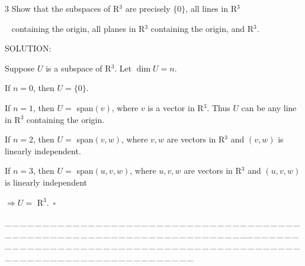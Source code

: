 \documentclass[a4paper, 11pt, UTF8]{article}
\begin{document}
\begin{large}
{\timesbf\Large 3} {\timessl\Large 
Show that the subspaces of {\timesbf R}$^3$ are precisely $\{0\}$, all lines in {\timesbf R}$^3$}\par\,\,\,
{\timessl\Large containing the origin, all planes in {\timesbf R}$^3$ containing the origin, and {\timesbf R}$^3$.
}\par
{\timesbf S\footnotesize{OLUTION:}}\par\quad
Suppose $U$ is a subspace of {\timesbf R}$^3$. Let $\dim U=n.$\par\quad
If $n=0$, then $U=\{0\}.$\par\quad
If $n=1$, then $U=$ span$(v)$, where $v$ is a vector in {\timesbf R}$^3$. Thus $U$ can be any line in {\timesbf R}$^3$ containing the origin.\par\quad
If $n=2$, then $U=$ span$(v,w)$, where $v,w$ are vectors in {\timesbf R}$^3$ and $(v,w)$ is linearly independent.\par {}\quad
If $n=3$, then $U=$ span$(u,v,w)$, where $u,v,w$ are vectors in {\timesbf R}$^3$ and $(u,v,w)$ is linearly independent\par
\centerline {$\Rightarrow U=$ {\timesbf R}$^3.\,\,\,\square$}\par
{\tiny \_\,\_\,\_\,\_\,\_\,\_\,\_\,\_\,\_\,\_\,\_\,\_\,\_\,\_\,\_\,\_\,\_\,\_\,\_\,\_\,\_\,\_\,\_\,\_\,\_\,\_\,\_\,\_\,\_\,\_\,\_\,\_\,\_\,\_\,\_\,\_\,\_\,\_\,\_\,\_\,\_\,\_\,\_\,\_\,\_\,\_\,\_\,\_\,\_\,\_\,\_\,\_\,\_\,\_\,\_\,\_\,\_\,\_\,\_\,\_\,\_\,\_\,\_\,\_\,\_\,\_\,\_\,\_\,\_\,\_\,\_\_\,\_\,\_\,\_\,\_\,\_\,\_\,\_\,\_\,\_\,\_\,\_\,\_\,\_\,\_\,\_\,\_\,\_\,\_\,\_\,\_\,\_\,\_\,\_\,\_\,\_\,\_\,\_\,\_\,\_\,\_\,\_\,\_\,\_\,\_\,\_\,\_\,\_\,\_\,\_\,\_\,\_\,\_\,\_\,\_\,\_\,\_\,\_\,\_\,\_\,\_\,\_\,\_\,\_\,\_\,\_\,\_\,\_\,\_\,\_\,\_\,\_\,\_\,\_\,\_\,\_\,\_\,\_\,\_\,\_\,\_}{\tiny\,\par}


\end{large}
\end{document}

